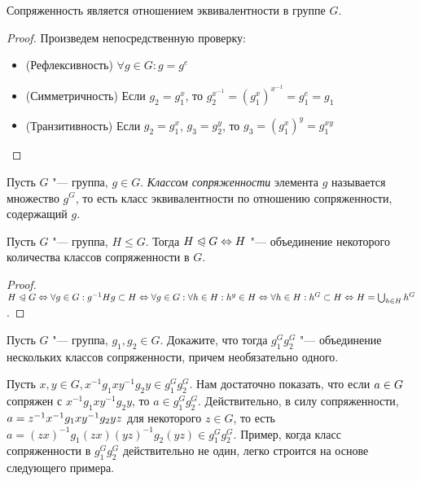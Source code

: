 \begin{proposition}
	Сопряженность является отношением эквивалентности в группе $G$.
\end{proposition}

\begin{proof} Произведем непосредственную проверку:
	\begin{itemize}
		\item (Рефлексивность) $\forall g \in G: g = g^e$
		\item (Симметричность) Если $g_2 = g_1^x$, то $g_2^{x^{-1}} = (g_1^x)^{x^{-1}} = g_1^e = g_1$
		\item (Транзитивность) Если $g_2 = g_1^x$, $g_3 = g_2^y$, то $g_3 = (g_1^x)^y = g_1^{xy}$
	\end{itemize}
\end{proof}

\begin{definition}
	Пусть $G$ "--- группа, $g \in G$. \textit{Классом сопряженности} элемента $g$ называется множество $g^G$, то есть класс эквивалентности по отношению сопряженности, содержащий $g$.
\end{definition}

\begin{proposition}
	Пусть $G$ "--- группа, $H \le G$. Тогда $H \normal G \hm\Leftrightarrow H$ "--- объединение некоторого количества классов сопряженности в $G$.
\end{proposition}

\begin{proof}
	$H \normal G \Leftrightarrow \forall g \in G: g^{-1}Hg \subset H \Leftrightarrow \forall g \in G: \forall h \hm\in H: h^g \in H \Leftrightarrow \forall h \in H: h^G \subset H \Leftrightarrow H = \bigcup_{h \in H}h^G$.
\end{proof}

\begin{exercise}
	Пусть $G$ "--- группа, $g_1, g_2 \in G$. Докажите, что тогда $g_1^Gg_2^G$ "--- объединение нескольких классов сопряженности, причем необязательно одного.
\end{exercise}

\begin{solution}
	Пусть $x, y \in G, x^{-1}g_1xy^{-1}g_2y \in g_1^Gg_2^G$. Нам достаточно показать, что если $a \hm\in G$ сопряжен с $x^{-1}g_1xy^{-1}g_2y$, то $a \in g_1^Gg_2^G$. Действительно, в силу сопряженности, $a \hm= z^{-1}x^{-1}g_1xy^{-1}g_2yz$ для некоторого $z \in G$, то есть $a = (zx)^{-1}g_1(zx)(yz)^{-1}g_2(yz) \in g_1^Gg_2^G$. Пример, когда класс сопряженности в $g_1^Gg_2^G$ действительно не один, легко строится на основе следующего примера.
\end{solution}

